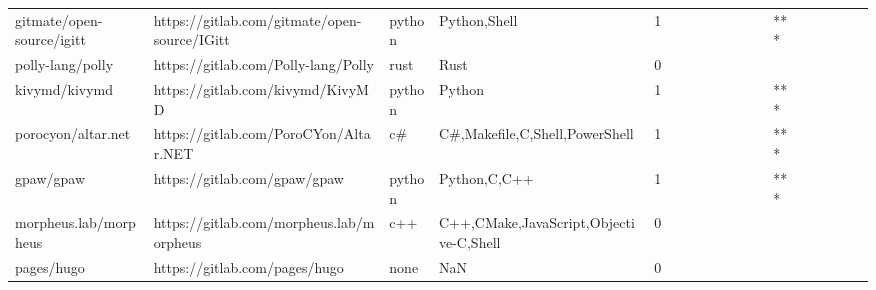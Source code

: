 \begin{tabular}{llllrlllllllllllll}
gitmate/open-source/igitt                          &       https://gitlab.com/gitmate/open-source/IGitt &            python &                                       Python,Shell &       1 &         &        &           &                &                 &        &           &       *** &          &          &       &              &          \\
polly-lang/polly                                   &                https://gitlab.com/Polly-lang/Polly &              rust &                                               Rust &       0 &         &        &           &                &                 &        &           &           &          &          &       &              &          \\
kivymd/kivymd                                      &                   https://gitlab.com/kivymd/KivyMD &            python &                                             Python &       1 &         &        &           &                &                 &        &           &       *** &          &          &       &              &          \\
porocyon/altar.net                                 &              https://gitlab.com/PoroCYon/Altar.NET &                c\# &                     C\#,Makefile,C,Shell,PowerShell &       1 &         &        &           &                &                 &        &           &       *** &          &          &       &              &          \\
gpaw/gpaw                                          &                       https://gitlab.com/gpaw/gpaw &            python &                                       Python,C,C++ &       1 &         &        &           &                &                 &        &           &       *** &          &          &       &              &          \\
morpheus.lab/morpheus                              &           https://gitlab.com/morpheus.lab/morpheus &               c++ &             C++,CMake,JavaScript,Objective-C,Shell &       0 &         &        &           &                &                 &        &           &           &          &          &       &              &          \\
pages/hugo                                         &                      https://gitlab.com/pages/hugo &              none &                                                NaN &       0 &         &        &           &                &                 &        &           &           &          &          &       &              &          \\

\end{tabular}
